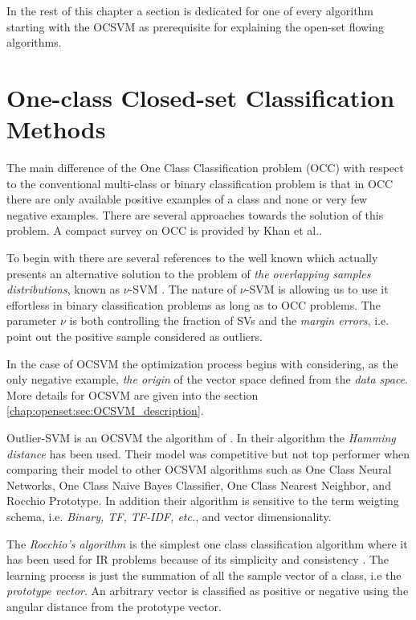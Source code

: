 In the rest of this chapter a section is dedicated for one of every algorithm starting with the OCSVM as prerequisite for explaining the open-set flowing algorithms.


\section{One-class Closed-set Classification Methods}\label{chap:openset:sec:One_Class_Classification}


The main difference of the One Class Classification problem (OCC) with respect to the conventional multi-class or binary classification problem is that in OCC there are only available positive examples of a class and none or very few negative examples. There are several approaches towards the solution of this problem. A compact survey on OCC is provided by Khan et al.\parencite{khan2010survey}. 

To begin with there are several references to the well known \parencite{scholkopf1999estimating} which actually presents an alternative solution to the problem of \textit{the overlapping samples distributions}, known as $\nu$-SVM \parencite{bishop2006}. The nature of $\nu$-SVM is allowing us to use it effortless in binary classification problems as long as to OCC problems. The parameter $\nu$ is both controlling the fraction of SVs and the \textit{margin errors}, i.e. point out the positive sample considered as outliers. 

In the case of OCSVM the optimization process begins with considering, as the only negative example, \textit{the origin} of the vector space defined from the \textit{data space}. More details for OCSVM are given into the section \ref{chap:openset:sec:OCSVM_description}.

Outlier-SVM is an OCSVM the algorithm of \parencite{manevitz2002one,khan2010survey}. In their algorithm the \textit{Hamming distance} has been used. Their model was competitive but not top performer when comparing their model to other OCSVM algorithms such as One Class Neural Networks, One Class Naive Bayes Classifier, One Class Nearest Neighbor, and Rocchio Prototype. In addition their algorithm is sensitive to the term weigting schema, i.e. \textit{Binary, TF, TF-IDF, etc.}, and vector dimensionality. 

The \textit{Rocchio's algorithm} is the simplest one class classification algorithm where it has been used for IR problems because of its simplicity and consistency \parencite{joachims1997probabilistic}. The learning process is just the summation of all the sample vector of a class, i.e the \textit{prototype vector}. An arbitrary vector is classified as positive or negative using the angular distance from the prototype vector.

